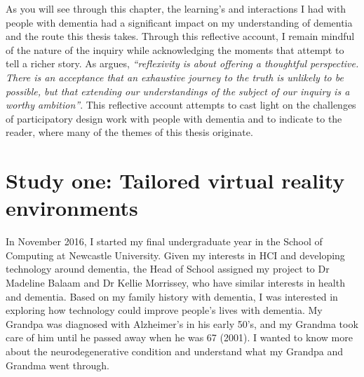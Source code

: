 As you will see through this chapter, the learning's and interactions I had with people with dementia had a significant impact on my understanding of dementia and the route this thesis takes. Through this reflective account, I remain mindful of the nature of the inquiry while acknowledging the moments that attempt to tell a richer story. As \cite{cousin2013reflexivity} argues, \textit{``reflexivity is about offering a thoughtful perspective. There is an acceptance that an exhaustive journey to the truth is unlikely to be possible, but that extending our understandings of the subject of our inquiry is a worthy ambition''}. This reflective account attempts to cast  light on the challenges of participatory design work with people with dementia and to indicate to the reader, where many of the themes of this thesis originate. 

\section{Study one: Tailored virtual reality environments}
\label{StudyOne}
In November 2016, I started my final undergraduate year in the School of Computing at Newcastle University. Given my interests in  HCI and developing technology around dementia, the Head of School assigned my project to Dr Madeline Balaam and Dr Kellie Morrissey, who have similar interests in health and dementia. Based on my family history with dementia, I was interested in exploring how technology could improve people's lives with dementia. My Grandpa was diagnosed with Alzheimer’s in his early 50’s, and my Grandma took care of him until he passed away when he was 67 (2001). I wanted to know more about the neurodegenerative condition and understand what my Grandpa and Grandma went through. 


